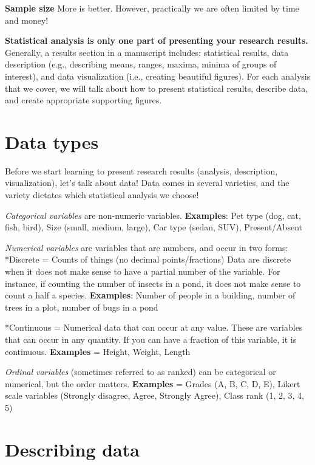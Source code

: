 \documentclass[
]{book}
\begin{document}
\textbf{Sample size} More is better. However, practically we are often limited by time and money!

\textbf{Statistical analysis is only one part of presenting your research results.} Generally, a results section in a manuscript includes: statistical results, data description (e.g., describing means, ranges, maxima, minima of groups of interest), and data visualization (i.e., creating beautiful figures). For each analysis that we cover, we will talk about how to present statistical results, describe data, and create appropriate supporting figures.

\hypertarget{data-types}{%
\section{Data types}\label{data-types}}

Before we start learning to present research results (analysis, description, visualization), let's talk about data! Data comes in several varieties, and the variety dictates which statistical analysis we choose!

\emph{Categorical variables} are non-numeric variables.
\textbf{Examples}: Pet type (dog, cat, fish, bird), Size (small, medium, large), Car type (sedan, SUV), Present/Absent

\emph{Numerical variables} are variables that are numbers, and occur in two forms:
*Discrete = Counts of things (no decimal points/fractions)
Data are discrete when it does not make sense to have a partial number of the variable. For instance, if counting the number of insects in a pond, it does not make sense to count a half a species.
\textbf{Examples}: Number of people in a building, number of trees in a plot, number of bugs in a pond

*Continuous = Numerical data that can occur at any value.
These are variables that can occur in any quantity. If you can have a fraction of this variable, it is continuous.
\textbf{Examples} = Height, Weight, Length

\emph{Ordinal variables} (sometimes referred to as ranked) can be categorical or numerical, but the order matters.
\textbf{Examples} = Grades (A, B, C, D, E), Likert scale variables (Strongly disagree, Agree, Strongly Agree), Class rank (1, 2, 3, 4, 5)

\hypertarget{describing-data}{%
\section{Describing data}\label{describing-data}}
\end{document}
